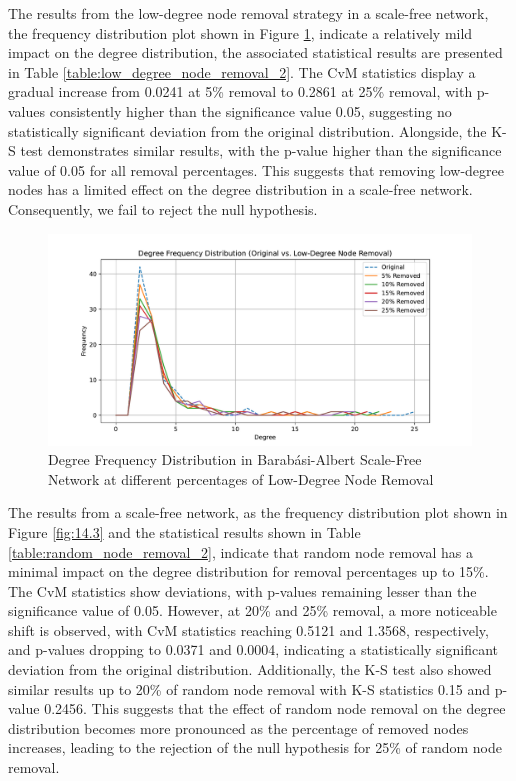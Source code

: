\documentclass[conference]{IEEEtran} %
\begin{document}
The results from the low-degree node removal strategy in a scale-free network, the frequency distribution plot shown in Figure \ref{fig:14.2}, indicate a relatively mild impact on the degree distribution, the associated statistical results are presented in Table \ref{table:low_degree_node_removal_2}. The CvM statistics display a gradual increase from 0.0241 at 5\% removal to 0.2861 at 25\% removal, with p-values consistently higher than the significance value 0.05, suggesting no statistically significant deviation from the original distribution. Alongside, the K-S test demonstrates similar results, with the p-value higher than the significance value of 0.05 for all removal percentages. This suggests that removing low-degree nodes has a limited effect on the degree distribution in a scale-free network. Consequently, we fail to reject the null hypothesis.

\begin{figure}[t]
  \centering
  \includegraphics[width=1.1\linewidth]{scale_free_network_frequency_distribution_plot_Low-Degree Node Removal.pdf}
  \caption{Degree Frequency Distribution in Barabási-Albert Scale-Free Network at different percentages of Low-Degree Node Removal}
  \label{fig:14.2}
\end{figure}

The results from a scale-free network, as the frequency distribution plot shown in Figure \ref{fig:14.3} and the statistical results shown in Table \ref{table:random_node_removal_2}, indicate that random node removal has a minimal impact on the degree distribution for removal percentages up to 15\%. The CvM statistics show deviations, with p-values remaining lesser than the significance value of 0.05. However, at 20\% and 25\% removal, a more noticeable shift is observed, with CvM statistics reaching 0.5121 and 1.3568, respectively, and p-values dropping to 0.0371 and 0.0004, indicating a statistically significant deviation from the original distribution. Additionally, the K-S test also showed similar results up to 20\% of random node removal with K-S statistics 0.15 and p-value 0.2456. This suggests that the effect of random node removal on the degree distribution becomes more pronounced as the percentage of removed nodes increases, leading to the rejection of the null hypothesis for  25\% of random node removal.
\end{document}
